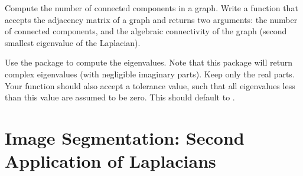 \begin{problem}
\leavevmode
Compute the number of connected components in a graph.
Write a function that accepts the adjacency matrix of a graph and returns two arguments: the number of connected components, and the algebraic connectivity of the graph (second smallest eigenvalue of the Laplacian).

Use the  package to compute the eigenvalues.
Note that this package will return complex eigenvalues (with negligible imaginary parts). Keep only the real parts.
Your function should also accept a tolerance value, such that all eigenvalues less than this value are assumed to be zero.
This should default to .

\end{problem}


\section*{Image Segmentation: Second Application of Laplacians}


